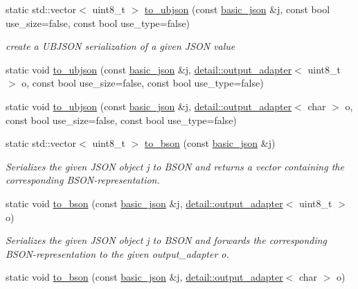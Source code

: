 \begin{DoxyCompactItemize}
static std\+::vector$<$ uint8\+\_\+t $>$ \hyperlink{classnlohmann_1_1basic__json_a25355b9719db23b189fb5f6a8f4f16c4}{to\+\_\+ubjson} (const \hyperlink{classnlohmann_1_1basic__json}{basic\+\_\+json} \&j, const bool use\+\_\+size=false, const bool use\+\_\+type=false)
\begin{DoxyCompactList}\small\item\em create a U\+B\+J\+S\+ON serialization of a given J\+S\+ON value \end{DoxyCompactList}\item 
static void \hyperlink{classnlohmann_1_1basic__json_a19dad92c4fe9e6a289a93195e1230e97}{to\+\_\+ubjson} (const \hyperlink{classnlohmann_1_1basic__json}{basic\+\_\+json} \&j, \hyperlink{classnlohmann_1_1detail_1_1output__adapter}{detail\+::output\+\_\+adapter}$<$ uint8\+\_\+t $>$ o, const bool use\+\_\+size=false, const bool use\+\_\+type=false)
\item 
static void \hyperlink{classnlohmann_1_1basic__json_a6d133cf7b2e729e9e215edeba5726116}{to\+\_\+ubjson} (const \hyperlink{classnlohmann_1_1basic__json}{basic\+\_\+json} \&j, \hyperlink{classnlohmann_1_1detail_1_1output__adapter}{detail\+::output\+\_\+adapter}$<$ char $>$ o, const bool use\+\_\+size=false, const bool use\+\_\+type=false)
\item 
static std\+::vector$<$ uint8\+\_\+t $>$ \hyperlink{classnlohmann_1_1basic__json_aa62d64781b217372225a0652047d8cf3}{to\+\_\+bson} (const \hyperlink{classnlohmann_1_1basic__json}{basic\+\_\+json} \&j)
\begin{DoxyCompactList}\small\item\em Serializes the given J\+S\+ON object {\ttfamily j} to B\+S\+ON and returns a vector containing the corresponding B\+S\+O\+N-\/representation. \end{DoxyCompactList}\item 
static void \hyperlink{classnlohmann_1_1basic__json_a668e4c2ad9808218a25879700f4aef2b}{to\+\_\+bson} (const \hyperlink{classnlohmann_1_1basic__json}{basic\+\_\+json} \&j, \hyperlink{classnlohmann_1_1detail_1_1output__adapter}{detail\+::output\+\_\+adapter}$<$ uint8\+\_\+t $>$ o)
\begin{DoxyCompactList}\small\item\em Serializes the given J\+S\+ON object {\ttfamily j} to B\+S\+ON and forwards the corresponding B\+S\+O\+N-\/representation to the given output\+\_\+adapter {\ttfamily o}. \end{DoxyCompactList}\item 
static void \hyperlink{classnlohmann_1_1basic__json_a9ebed178fb7dad1a574bcb7c361fb1b8}{to\+\_\+bson} (const \hyperlink{classnlohmann_1_1basic__json}{basic\+\_\+json} \&j, \hyperlink{classnlohmann_1_1detail_1_1output__adapter}{detail\+::output\+\_\+adapter}$<$ char $>$ o)

\end{DoxyCompactItemize}
